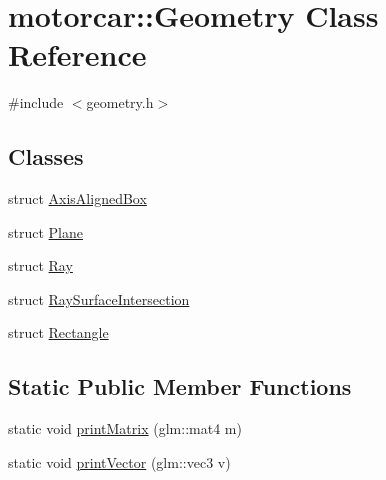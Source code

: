 \hypertarget{classmotorcar_1_1Geometry}{\section{motorcar\-:\-:Geometry Class Reference}
\label{classmotorcar_1_1Geometry}
}


{\ttfamily \#include $<$geometry.\-h$>$}

\subsection*{Classes}
\begin{DoxyCompactItemize}
\item 
struct \hyperlink{structmotorcar_1_1Geometry_1_1AxisAlignedBox}{Axis\-Aligned\-Box}
\item 
struct \hyperlink{structmotorcar_1_1Geometry_1_1Plane}{Plane}
\item 
struct \hyperlink{structmotorcar_1_1Geometry_1_1Ray}{Ray}
\item 
struct \hyperlink{structmotorcar_1_1Geometry_1_1RaySurfaceIntersection}{Ray\-Surface\-Intersection}
\item 
struct \hyperlink{structmotorcar_1_1Geometry_1_1Rectangle}{Rectangle}
\end{DoxyCompactItemize}
\subsection*{Static Public Member Functions}
\begin{DoxyCompactItemize}
\item 
static void \hyperlink{classmotorcar_1_1Geometry_a35ee70e5dab9981b9f1914eca9580b06}{print\-Matrix} (glm\-::mat4 m)
\item 
static void \hyperlink{classmotorcar_1_1Geometry_a97660333acd464a86c5ab7f5672fb3d2}{print\-Vector} (glm\-::vec3 v)
\end{DoxyCompactItemize}


